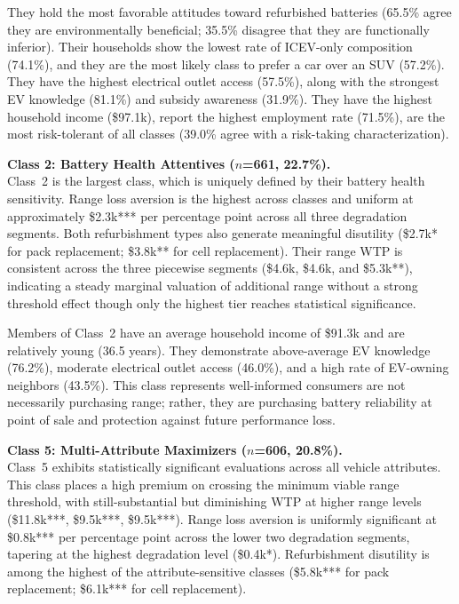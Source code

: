 \documentclass[a4paper,fleqn]{cas-sc}   %
\begin{document}
They hold the most favorable attitudes toward refurbished batteries (65.5\% agree they are environmentally beneficial; 35.5\% disagree that they are functionally inferior). Their households show the lowest rate of ICEV-only composition (74.1\%), and they are the most likely class to prefer a car over an SUV (57.2\%). They have the highest electrical outlet access (57.5\%), along with the strongest EV knowledge (81.1\%) and subsidy awareness (31.9\%). They have the highest household income (\$97.1k), report the highest employment rate (71.5\%), are the most risk-tolerant of all classes (39.0\% agree with a risk-taking characterization).

\medskip

\noindent\textbf{Class 2: Battery Health Attentives ($n$=661, 22.7\%).}\\
Class~2 is the largest class, which is uniquely defined by their battery health sensitivity. Range loss aversion is the highest across classes and uniform at approximately \$2.3k*** per percentage point across all three degradation segments. Both refurbishment types also generate meaningful disutility (\$2.7k* for pack replacement; \$3.8k** for cell replacement). Their range WTP is consistent across the three piecewise segments (\$4.6k, \$4.6k, and \$5.3k**), indicating a steady marginal valuation of additional range without a strong threshold effect though only the highest tier reaches statistical significance.

Members of Class~2 have an average household income of \$91.3k and are relatively young (36.5 years). They demonstrate above-average EV knowledge (76.2\%), moderate electrical outlet access (46.0\%), and a high rate of EV-owning neighbors (43.5\%). This class represents well-informed consumers are not necessarily purchasing range; rather, they are purchasing battery reliability at point of sale and protection against future performance loss.

\medskip

\noindent\textbf{Class 5: Multi-Attribute Maximizers ($n$=606, 20.8\%).}\\
Class~5 exhibits statistically significant evaluations across all vehicle attributes. This class places a high premium on crossing the minimum viable range threshold, with still-substantial but diminishing WTP at higher range levels (\$11.8k***, \$9.5k***, \$9.5k***). Range loss aversion is uniformly significant at \$0.8k*** per percentage point across the lower two degradation segments, tapering at the highest degradation level (\$0.4k*). Refurbishment disutility is among the highest of the attribute-sensitive classes (\$5.8k*** for pack replacement; \$6.1k*** for cell replacement).
\end{document}
